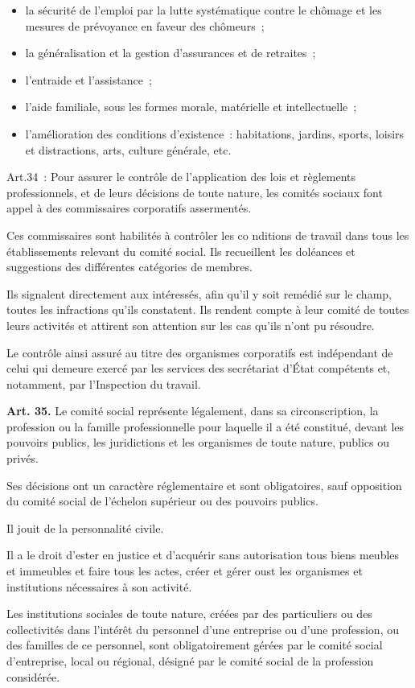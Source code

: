 \documentclass[french,twoside]{book} %
\newcommand{\labelchar}[1]{\textbf{\color{rubric} #1}}
\def\mednobreak{\ifdim\lastskip<\medskipamount
  \removelastskip\nopagebreak\medskip\fi}
\newcommand{\labelblock}[1]{\medbreak{\noindent\color{rubric}\bfseries #1}\par\mednobreak}
\begin{document}
\begin{itemize}[itemsep=0pt,]
\item la sécurité de l’emploi par la lutte systématique contre le chômage et les mesures de prévoyance en faveur des chômeurs ;
\item la généralisation et la gestion d’assurances et de retraites ;
\item l’entraide et l’assistance ;
\item l’aide familiale, sous les formes morale, matérielle et intellectuelle ;
\item l’amélioration des conditions d’existence : habitations, jardins, sports, loisirs et distractions, arts, culture générale, etc.
\end{itemize}
\bigbreak
\noindent Art.34 : Pour assurer le contrôle de l’application des lois et règlements professionnels, et de leurs décisions de toute nature, les comités sociaux font appel à des commissaires corporatifs assermentés.\par
Ces commissaires sont habilités à contrôler les co nditions de travail dans tous les établissements relevant du comité social. Ils recueillent les doléances et suggestions des différentes catégories de membres.\par
Ils signalent directement aux intéressés, afin qu’il y soit remédié sur le champ, toutes les infractions qu’ils constatent. Ils rendent compte à leur comité de toutes leurs activités et attirent son attention sur les cas qu’ils n’ont pu résoudre.\par
Le contrôle ainsi assuré au titre des organismes corporatifs est indépendant de celui qui demeure exercé par les services des secrétariat d’État compétents et, notamment, par l’Inspection du travail.\par

\labelblock{Pouvoirs et prérogatives des comités sociaux}

\noindent \labelchar{Art. 35.} Le comité social représente légalement, dans sa circonscription, la profession ou la famille professionnelle pour laquelle il a été constitué, devant les pouvoirs publics, les juridictions et les organismes de toute nature, publics ou privés.\par
Ses décisions ont un caractère réglementaire et sont obligatoires, sauf opposition du comité social de l’échelon supérieur ou des pouvoirs publics.\par
Il jouit de la personnalité civile.\par
Il a le droit d’ester en justice et d’acquérir sans autorisation tous biens meubles et immeubles et faire tous les actes, créer et gérer oust les organismes et institutions nécessaires à son activité.\par
Les institutions sociales de toute nature, créées par des particuliers ou des collectivités dans l’intérêt du personnel d’une entreprise ou d’une profession, ou des familles de ce personnel, sont obligatoirement gérées par le comité social d’entreprise, local ou régional, désigné par le comité social de la profession considérée.\par
\end{document}
